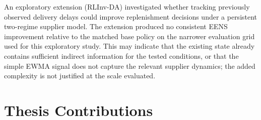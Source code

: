 An exploratory extension (RLInv-DA) investigated whether
tracking previously observed delivery delays could improve
replenishment decisions under a persistent two-regime
supplier model. The extension produced no consistent EENS
improvement relative to the matched base policy on the
narrower evaluation grid used for this exploratory study.
This may indicate that the existing state already
contains sufficient indirect information for the tested conditions, or
that the simple EWMA signal does not capture the relevant supplier
dynamics; the added complexity is not justified at the scale evaluated.

\section{Thesis Contributions}
\label{sec:conclusion_contributions}


